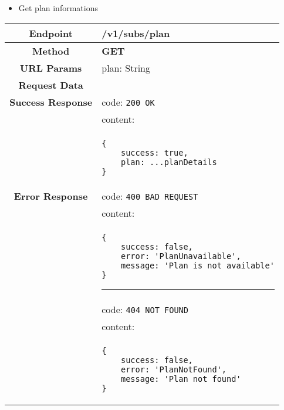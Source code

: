     \begin{itemize}
        \item Get plan informations
    \end{itemize}
    \begin{adjustwidth}{1cm}{}
        \begin{longtable}{|c|l|}
            \hline
            \textbf{Endpoint} & /v1/subs/plan \\
            \hline
            \textbf{Method} & \textbf{GET} \\
            \hline
            \textbf{URL Params} &  plan: String \\
            \hline
            \textbf{Request Data} & \\
            \hline
            \textbf{Success Response} & code: \texttt{200 OK} \\
            &                           content: \\
            & \begin{minipage}[t]{0.5\textwidth}
                \begin{adjustwidth}{1.5cm}{}
                \begin{verbatim}
{
    success: true, 
    plan: ...planDetails
}
                \end{verbatim}
                \end{adjustwidth}
              \end{minipage} \\
              \hline
            \textbf{Error Response} & code: \texttt{400 BAD REQUEST} \\
            &                         content: \\
            & \begin{minipage}[t]{0.7\textwidth}
                \begin{adjustwidth}{1.5cm}{}
                \begin{verbatim}
{
    success: false, 
    error: 'PlanUnavailable',
    message: 'Plan is not available'
}
                \end{verbatim}
                \end{adjustwidth}
                \par\noindent\rule{1.2\textwidth}{1pt}
                 \vspace{4pt}
              \end{minipage} \\
              
              &                     code: \texttt{404 NOT FOUND} \\
              &                     content: \\
              & \begin{minipage}[t]{0.7\textwidth}
                \begin{adjustwidth}{1.5cm}{}
                \begin{verbatim}
{
    success: false, 
    error: 'PlanNotFound',
    message: 'Plan not found'
}
                \end{verbatim}
                \end{adjustwidth}
                

\end{minipage}
\end{longtable}
\end{adjustwidth}
